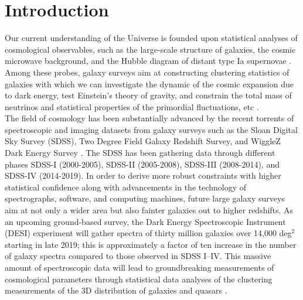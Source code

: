 \section{Introduction}\label{sec:intro}
Our current understanding of the Universe is founded upon statistical analyses of cosmological observables, such as the large-scale structure of galaxies, the cosmic microwave background, and the Hubble diagram of distant type Ia supernovae \citep[e.g.,][]{efstathiou1988analysis, fisher1993power, smoot1992structure, mather1994measurement,riess1998observational, perlmutter1999measurements, ata2017clustering, BOSSfinal, jones2018measuring, akrami2018planck, Elvin18}. Among these probes, galaxy surveys aim at constructing clustering statistics of galaxies with which we can investigate the dynamic of the cosmic expansion due to dark energy, test Einstein's theory of gravity, and constrain the total mass of neutrinos and statistical properties of the primordial fluctuations, etc \citep{peebles1973statistical,kaiser1987clustering,mukhanov1992theory,hamilton1998linear,eisenstein1998cosmic,seo2003probing,eisenstein2005dark,sanchez2008best, dalal2008imprints}.\\

The field of cosmology has been substantially advanced by the recent torrents of spectroscopic and imaging datasets from galaxy surveys such as the Sloan Digital Sky Survey (SDSS), Two Degree Field Galaxy Redshift Survey, and WiggleZ Dark Energy Survey \citep{york2000sloan, colless20012df, drinkwater2010wigglez}. The SDSS has been gathering data through different phases SDSS-I (2000-2005), SDSS-II (2005-2008), SDSS-III (2008-2014), and SDSS-IV (2014-2019). In order to derive more robust constraints with higher statistical confidence along with advancements in the technology of spectrographs, software, and computing machines, future large galaxy surveys aim at not only a wider area but also fainter galaxies out to higher redshifts. As an upcoming ground-based survey, the Dark Energy Spectroscopic Instrument (DESI) experiment will gather spectra of thirty million galaxies over 14,000 deg$^{2}$ starting in late 2019; this is approximately a factor of ten increase in the number of galaxy spectra compared to those observed in SDSS I--IV. This massive amount of spectroscopic data will lead to groundbreaking measurements of cosmological parameters through statistical data analyses of the clustering measurements of the 3D distribution of galaxies and quasars \citep{aghamousa2016desi}.\\ 


